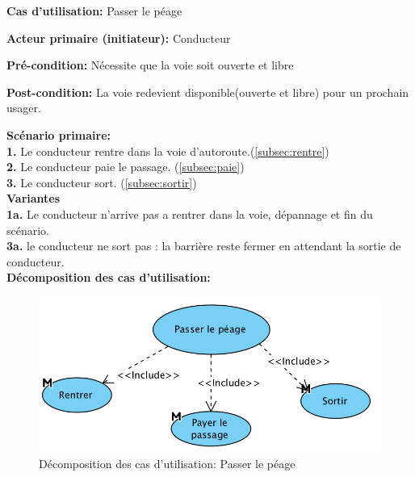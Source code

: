 \textbf{Cas d'utilisation:} Passer le péage
    
\textbf{Acteur primaire (initiateur):} Conducteur
    

\textbf{Pré-condition: } Nécessite que la voie soit ouverte et libre

    
\textbf{Post-condition: }   La voie redevient disponible(ouverte et libre) pour un prochain usager.
    
\textbf{Scénario primaire: } \\
\textbf{1.} Le conducteur rentre dans la voie d’autoroute.(\ref{subsec:rentre})
 \\
\textbf{2.} Le conducteur paie le passage. (\ref{subsec:paie})\\
\textbf{3.} Le conducteur sort. (\ref{subsec:sortir})\\
    
\textbf{Variantes}\\
\textbf{1a.} Le conducteur n’arrive pas a rentrer dans la voie, dépannage et fin du scénario.\\
\textbf{3a.} le conducteur ne sort pas : la barrière reste fermer en attendant la sortie de conducteur.\\

\textbf{Décomposition des cas d'utilisation:} 
\begin{figure}[h]
    \centering
    \includegraphics[scale=0.7]{02_Desenvolvimento/TD2/images/passerLePassage.png}
    \caption{Décomposition des cas d'utilisation: Passer le péage}
\end{figure}
